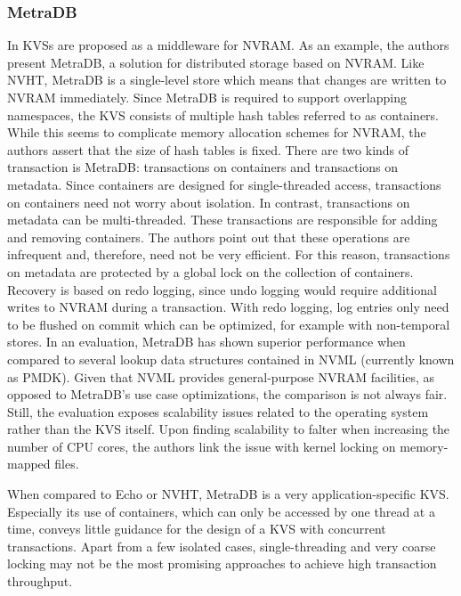 \subsubsection{MetraDB}

In \cite{marmol2016nonvolatile} \acp{KVS} are proposed as a middleware for
\ac{NVRAM}. As an example, the authors present MetraDB, a solution for
distributed storage based on \ac{NVRAM}. Like NVHT, MetraDB is a single-level
store which means that changes are written to \ac{NVRAM} immediately. Since
MetraDB is required to support overlapping namespaces, the \ac{KVS} consists of
multiple hash tables referred to as containers. While this seems to complicate
memory allocation schemes for \ac{NVRAM}, the authors assert that the size of
hash tables is fixed. There are two kinds of transaction is MetraDB:
transactions on containers and transactions on metadata. Since containers are
designed for single-threaded access, transactions on containers need not worry
about isolation. In contrast, transactions on metadata can be multi-threaded.
These transactions are responsible for adding and removing containers. The
authors point out that these operations are infrequent and, therefore, need not
be very efficient. For this reason, transactions on metadata are protected by a
global lock on the collection of containers. Recovery is based on redo logging,
since undo logging would require additional writes to \ac{NVRAM} during a
transaction. With redo logging, log entries only need to be flushed on commit
which can be optimized, for example with non-temporal stores. In an evaluation,
MetraDB has shown superior performance when compared to several lookup data
structures contained in NVML (currently known as PMDK). Given that NVML provides
general-purpose \ac{NVRAM} facilities, as opposed to MetraDB's use case
optimizations, the comparison is not always fair. Still, the evaluation exposes
scalability issues related to the operating system rather than the \ac{KVS}
itself. Upon finding scalability to falter when increasing the number of
\ac{CPU} cores, the authors link the issue with kernel locking on memory-mapped
files.

When compared to Echo or NVHT, MetraDB is a very application-specific \ac{KVS}.
Especially its use of containers, which can only be accessed by one thread at a
time, conveys little guidance for the design of a \ac{KVS} with concurrent
transactions. Apart from a few isolated cases, single-threading and very coarse
locking may not be the most promising approaches to achieve high transaction
throughput.
